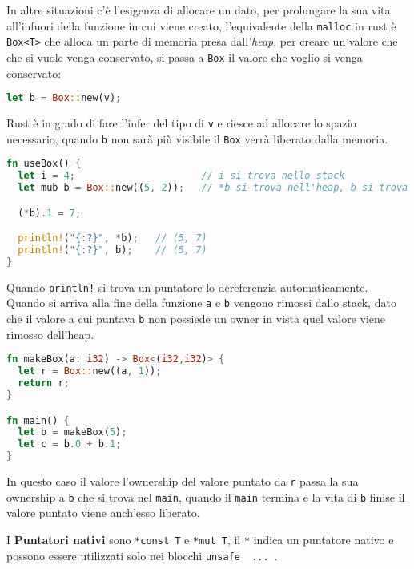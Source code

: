 \documentclass[12pt]{article}
\begin{document}
In altre situazioni c'\`e l'esigenza di allocare un dato, per prolungare la sua vita all'infuori della funzione in cui viene creato, l'equivalente della \texttt{malloc} in rust \`e \texttt{Box<T>} che alloca un parte di memoria presa dall'\emph{heap}, per creare un valore che che si vuole venga conservato, si passa a \texttt{Box} il valore che voglio si venga conservato:
\begin{lstlisting}[language=rust]
let b = Box::new(v);
\end{lstlisting}
Rust \`e in grado di fare l'infer del tipo di \texttt{v} e riesce ad allocare lo spazio necessario, quando \texttt{b} non sar\`a pi\`u visibile il \texttt{Box} verr\`a liberato dalla memoria.
\begin{lstlisting}[language=rust]
fn useBox() {
  let i = 4;                      // i si trova nello stack
  let mub b = Box::new((5, 2));   // *b si trova nell'heap, b si trova nello stack

  (*b).1 = 7;

  println!("{:?}", *b);   // (5, 7)
  println!("{:?}", b);    // (5, 7)
}
\end{lstlisting}
Quando \texttt{println!} si trova un puntatore lo dereferenzia automaticamente. Quando si arriva alla fine della funzione \texttt{a} e \texttt{b} vengono rimossi dallo stack, dato che il valore a cui puntava \texttt{b} non possiede un owner in vista quel valore viene rimosso dell'heap.
\begin{lstlisting}[language=rust]
fn makeBox(a: i32) -> Box<(i32,i32)> {
  let r = Box::new((a, 1));
  return r;
}

fn main() {
  let b = makeBox(5);
  let c = b.0 + b.1;
}
\end{lstlisting}
In questo caso il valore l'ownership del valore puntato da \texttt{r} passa la sua ownership a \texttt{b} che si trova nel \texttt{main}, quando il \texttt{main} termina e la vita di \texttt{b} finise il valore puntato viene anch'esso liberato.

I \textbf{Puntatori nativi} sono \texttt{*const T} e \texttt{*mut T}, il \texttt{*} indica un puntatore nativo e possono essere utilizzati solo nei blocchi \texttt{unsafe { ... }}.
\end{document}
